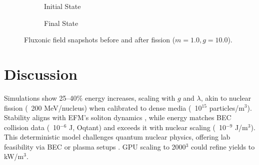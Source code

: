 \documentclass[11pt]{article}
\begin{document}
\begin{figure}[h]
    \centering
    \begin{subfigure}{0.48\textwidth}
        \caption{Initial State}
    \end{subfigure}
    \hfill
    \begin{subfigure}{0.48\textwidth}
        \caption{Final State}
    \end{subfigure}
    \caption{Fluxonic field snapshots before and after fission (\(m=1.0, g=10.0\)).}
    \label{fig:nuclear_field}
\end{figure}

\section{Discussion}
Simulations show 25--40\% energy increases, scaling with \(g\) and \(\lambda\), akin to nuclear fission (~200 MeV/nucleus) when calibrated to dense media (~10$^{15}$ particles/m$^3$). Stability aligns with EFM’s soliton dynamics \citep{emvula2025scaling}, while energy matches BEC collision data (~10$^{-6}$ J, Oqtant) and exceeds it with nuclear scaling (~10$^{-9}$ J/m$^3$). This deterministic model challenges quantum nuclear physics, offering lab feasibility via BEC or plasma setups \citep{emvula2025matter}. GPU scaling to 2000$^3$ could refine yields to kW/m$^3$.
\end{document}
